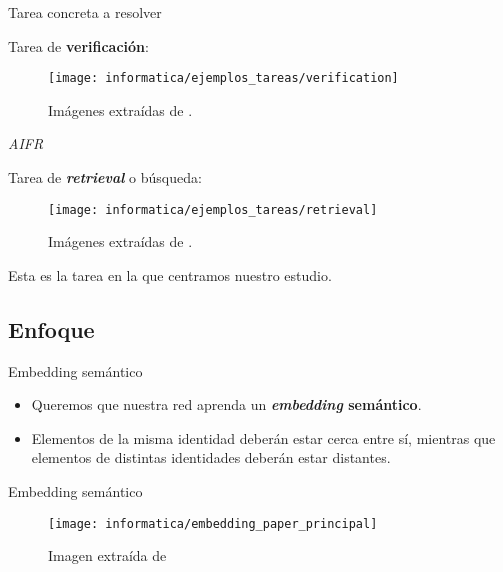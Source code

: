 \begin{frame}{Tarea concreta a resolver}

	Tarea de \textbf{verificación}:

	\begin{figure}[!h]
		\texttt{[image: informatica/ejemplos\_tareas/verification]}
		\caption{Imágenes extraídas de \cite{informatica:cacd_dataset}.}
	\end{figure}


\end{frame}

\begin{frame}{\textit{AIFR}}

	Tarea de \textbf{\textit{retrieval}} o búsqueda:

	\begin{figure}[!h]
		\texttt{[image: informatica/ejemplos\_tareas/retrieval]}
		\caption{Imágenes extraídas de \cite{informatica:cacd_dataset}.}
	\end{figure}

	Esta es la tarea en la que centramos nuestro estudio.

\end{frame}

\subsection{Enfoque}
\begin{frame}{Embedding semántico}

	\begin{itemize}
		\item Queremos que nuestra red aprenda un \textbf{\textit{embedding} semántico}.
		\item Elementos de la misma identidad deberán estar cerca entre sí, mientras que elementos de distintas identidades deberán estar distantes.
	\end{itemize}

\end{frame}

\begin{frame}{Embedding semántico}

	\begin{figure}
		\texttt{[image: informatica/embedding\_paper\_principal]}
		\caption{Imagen extraída de \cite{informatica:principal}}
	\end{figure}

\end{frame}

